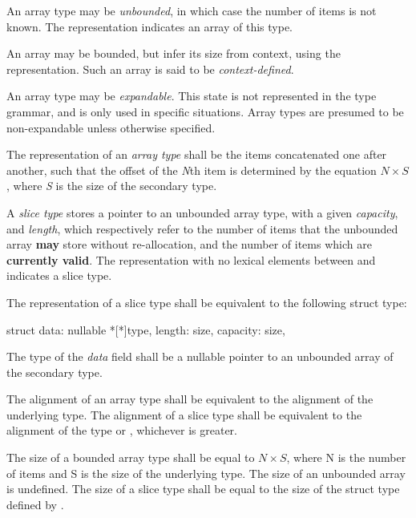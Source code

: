 \specsubsubitem
An array type may be \textit{unbounded}, in which case the number of items is
not known. The \terminal{*} representation indicates an array of this type.

\specsubsubitem
An array may be bounded, but infer its size from context, using the
\terminal{\_} representation. Such an array is said to be
\textit{context-defined}.

\specsubsubitem
An array type may be \textit{expandable}. This state is not represented in the
type grammar, and is only used in specific situations. Array types are presumed
to be non-expandable unless otherwise specified.

\specsubsubitem
The representation of an \textit{array type} shall be the items concatenated one
after another, such that the offset of the \textit{N}th item is determined by
the equation $N \times S$, where \textit{S} is the size of the secondary type.

\specsubsubitem
A \textit{slice type} stores a pointer to an unbounded array type, with a given
\textit{capacity}, and \textit{length}, which respectively refer to the number
of items that the unbounded array \textbf{may} store without re-allocation, and
the number of items which are \textbf{currently valid}. The representation with
no lexical elements between \terminal{[} and \terminal{]} indicates a slice
type.

\specsubsubitem
The representation of a slice type shall be equivalent to the following struct
type:

\begin{codesample}
struct {
	data: nullable *[*]type,
	length: size,
	capacity: size,
}
\end{codesample}

The type of the \textit{data} field shall be a nullable pointer to an unbounded
array of the secondary type.

\specsubsubitem
The alignment of an array type shall be equivalent to the alignment of the
underlying type. The alignment of a slice type shall be equivalent to the
alignment of the  type or , whichever is
greater.

\specsubsubitem
The size of a bounded array type shall be equal to $N \times S$, where N is the
number of items and S is the size of the underlying type. The size of an
unbounded array is undefined. The size of a slice type shall be equal to the
size of the struct type defined by .

